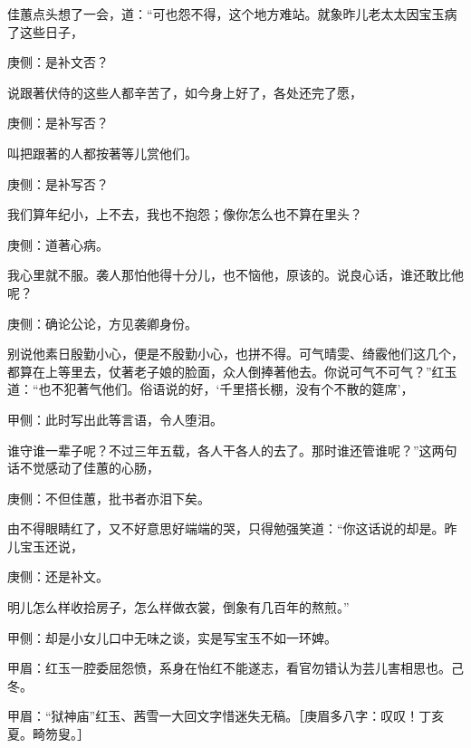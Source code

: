 \begin{parag}
    佳蕙点头想了一会，道：“可也怨不得，这个地方难站。就象昨儿老太太因宝玉病了这些日子，\begin{note}庚侧：是补文否？\end{note}说跟著伏侍的这些人都辛苦了，如今身上好了，各处还完了愿，\begin{note}庚侧：是补写否？\end{note}叫把跟著的人都按著等儿赏他们。\begin{note}庚侧：是补写否？\end{note}我们算年纪小，上不去，我也不抱怨；像你怎么也不算在里头？\begin{note}庚侧：道著心病。\end{note}我心里就不服。袭人那怕他得十分儿，也不恼他，原该的。说良心话，谁还敢比他呢？\begin{note}庚侧：确论公论，方见袭卿身份。\end{note}别说他素日殷勤小心，便是不殷勤小心，也拼不得。可气晴雯、绮霰他们这几个，都算在上等里去，仗著老子娘的脸面，众人倒捧著他去。你说可气不可气？”红玉道：“也不犯著气他们。俗语说的好，‘千里搭长棚，没有个不散的筵席’，\begin{note}甲侧：此时写出此等言语，令人堕泪。\end{note}谁守谁一辈子呢？不过三年五载，各人干各人的去了。那时谁还管谁呢？”这两句话不觉感动了佳蕙的心肠，\begin{note}庚侧：不但佳蕙，批书者亦泪下矣。\end{note}由不得眼睛红了，又不好意思好端端的哭，只得勉强笑道：“你这话说的却是。昨儿宝玉还说，\begin{note}庚侧：还是补文。\end{note}明儿怎么样收拾房子，怎么样做衣裳，倒象有几百年的熬煎。”\begin{note}甲侧：却是小女儿口中无味之谈，实是写宝玉不如一环婢。\end{note}\begin{note}甲眉：红玉一腔委屈怨愤，系身在怡红不能遂志，看官勿错认为芸儿害相思也。己冬。\end{note}\begin{note}甲眉：“狱神庙”红玉、茜雪一大回文字惜迷失无稿。［庚眉多八字：叹叹！丁亥夏。畸笏叟。］\end{note}
\end{parag}


